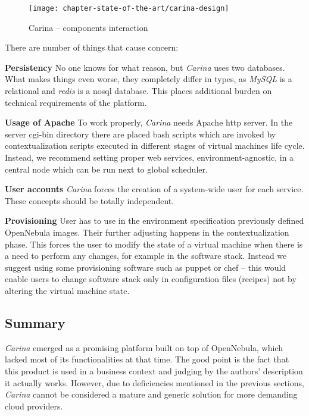 \begin{figure}[!ht]
  \begin{center}
    \texttt{[image: chapter-state-of-the-art/carina-design]}
  \end{center}
  \caption{Carina -- components interaction}
  \label{sota:carina-design}
\end{figure}

There are number of things that cause concern:
\begin{asparaenum}
\item[\textbf{Persistency}] No one knows for what reason, but \emph{Carina} uses two databases. What makes things even worse, they completely differ in types, as \emph{MySQL} is a relational and \emph{redis} is a nosql database. This places additional burden on technical requirements of the platform.
\item[\textbf{Usage of Apache}] To work properly, \emph{Carina} needs Apache http server. In the server cgi-bin directory there are placed bash scripts which are invoked by contextualization scripts executed in different stages of virtual machines life cycle. Instead, we recommend setting proper web services, environment-agnostic, in a central node which can be run next to global scheduler.
\item[\textbf{User accounts}] \emph{Carina} forces the creation of a system-wide user for each service. These concepts should be totally independent.
\item[\textbf{Provisioning}] User has to use in the environment specification previously defined OpenNebula images. Their further adjusting happens in the contextualization phase. This forces the user to modify the state of a virtual machine when there is a need to perform any changes, for example in the software stack. Instead we suggest using some provisioning software such as puppet or chef -- this would enable users to change software stack only in configuration files (recipes) not by altering the virtual machine state.
\end{asparaenum}

\subsection{Summary}
\emph{Carina} emerged as a promising platform built on top of OpenNebula, which lacked most of its functionalities at that time. The good point is the fact that this product is used in a business context and judging by the authors' description it actually works. However, due to deficiencies mentioned in the previous sections, \emph{Carina} cannot be considered a mature and generic solution for more demanding cloud providers.



